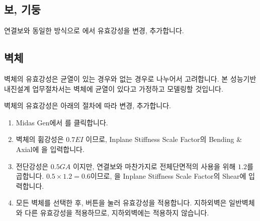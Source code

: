 \documentclass[a4paper,11pt,korean,openany,oneside]{sphinxmanual}
\begin{document}
\subsection{보, 기둥}
\label{\detokenize{1_stiffness_setting:id4}}
\sphinxAtStartPar
연결보와 동일한 방식으로 에서 유효강성을 변경, 추가합니다.


\subsection{벽체}
\label{\detokenize{1_stiffness_setting:id5}}
\sphinxAtStartPar
벽체의 유효강성은 균열이 있는 경우와 없는 경우로 나누어서 고려합니다.
본 성능기반 내진설계 업무절차서는 벽체에 균열이 있다고 가정하고 모델링할 것입니다.

\sphinxAtStartPar
벽체의 유효강성은 아래의 절차에 따라 변경, 추가합니다.

\begin{sphinxShadowBox}
\begin{enumerate}
%
\item {} 
\sphinxAtStartPar
Midas Gen에서  \sphinxhyphen{}  \sphinxhyphen{} 를 클릭합니다.

\item {} 
\sphinxAtStartPar
벽체의 휨강성은 \(0.7EI\) 이므로, Inplane Stiffness Scale Factor의 Bending \& Axial에 을 입력합니다.

\item {} 
\sphinxAtStartPar
전단강성은 \(0.5GA\) 이지만, 연결보와 마찬가지로 전체단면적의 사용을 위해 \(1.2\)를 곱합니다.
\(0.5 \times 1.2 = 0.6\)이므로, 을 Inplane Stiffness Scale Factor의 Shear에 입력합니다.

\begin{center}
\noindent{}
\end{center}

\item {} 
\sphinxAtStartPar
모든 벽체를 선택한 후,  버튼을 눌러 유효강성을 적용합니다.
지하외벽은 일반벽체와 다른 유효강성을 적용하므로, 지하외벽에는 적용하지 않습니다.

\end{enumerate}
\end{sphinxShadowBox}
\end{document}
